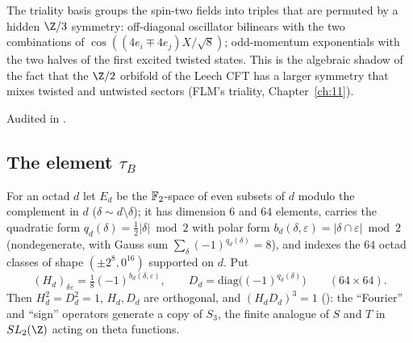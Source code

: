 \begin{physics}
The triality basis groups the spin-two fields into triples that are permuted by a hidden $\Z/3$
symmetry: off-diagonal oscillator bilinears with the two combinations of $\cos((4e_i\mp4e_j)X/\sqrt8)$;
odd-momentum exponentials with the two halves of the first excited twisted states.  This is the
algebraic shadow of the fact that the $\Z/2$ orbifold of the Leech CFT has a larger symmetry that mixes
twisted and untwisted sectors (FLM's triality, Chapter~\ref{ch:11}).
\end{physics}
\begin{status}
Audited in .
\end{status}

\subsection{The element \texorpdfstring{$\tau_B$}{tauB}}

For an octad $d$ let $E_d$ be the $\mathbb{F}_2$-space of even subsets of $d$ modulo the complement in $d$
($\delta\sim d\setminus\delta$); it has dimension $6$ and $64$ elements, carries the quadratic form
$q_d(\delta)=\tfrac12|\delta|\bmod2$ with polar form $b_d(\delta,\varepsilon)=|\delta\cap\varepsilon|\bmod2$
(nondegenerate, with Gauss sum $\sum_\delta(-1)^{q_d(\delta)}=8$), and indexes the $64$ octad classes of
shape $(\pm2^8,0^{16})$ supported on $d$.  Put
\begin{equation*}
  (H_d)_{\delta\varepsilon}=\tfrac18(-1)^{b_d(\delta,\varepsilon)},\qquad
  D_d=\mathrm{diag}\bigl((-1)^{q_d(\delta)}\bigr)\qquad(64\times64).
\end{equation*}
Then $H_d^2=D_d^2=1$, $H_d,D_d$ are orthogonal, and $(H_dD_d)^3=1$ ():
the ``Fourier'' and ``sign'' operators generate a copy of $S_3$, the finite analogue of $S$ and $T$ in
$SL_2(\Z)$ acting on theta functions.

